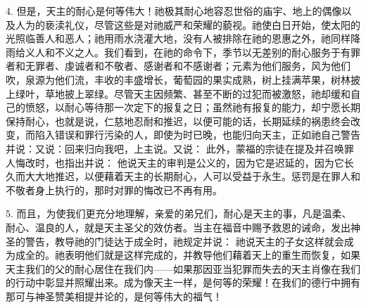 4. 但是，天主的耐心是何等伟大！祂极其耐心地容忍世俗的庙宇、地上的偶像以及人为的亵渎礼仪，尽管这些是对祂威严和荣耀的藐视。祂使白日开始，使太阳的光照临善人和恶人；祂用雨水浇灌大地，没有人被排除在祂的恩惠之外，祂同样降雨给义人和不义之人。我们看到，在祂的命令下，季节以无差别的耐心服务于有罪者和无罪者、虔诚者和不敬者、感谢者和不感谢者；元素为他们服务，风为他们吹，泉源为他们流，丰收的丰盛增长，葡萄园的果实成熟，树上挂满苹果，树林披上绿叶，草地披上翠绿。尽管天主因频繁、甚至不断的过犯而被激怒，祂却缓和自己的愤怒，以耐心等待那一次定下的报复之日；虽然祂有报复的能力，却宁愿长期保持耐心，也就是说，仁慈地忍耐和推迟，以便可能的话，长期延续的祸患终会改变，而陷入错误和罪行污染的人，即使为时已晚，也能归向天主，正如祂自己警告并说：又说：回来归向我吧，上主说。又说： 此外，蒙福的宗徒在提及并召唤罪人悔改时，也指出并说： 他说天主的审判是公义的，因为它是迟延的，因为它长久而大大地推迟，以便藉着天主的长期耐心，人可以受益于永生。惩罚是在罪人和不敬者身上执行的，那时对罪的悔改已不再有用。\par

5. 而且，为使我们更充分地理解，亲爱的弟兄们，耐心是天主的事，凡是温柔、耐心、温良的人，就是天主圣父的效仿者。当主在福音中赐予救恩的诫命，发出神圣的警告，教导祂的门徒达于成全时，祂规定并说： 祂说天主的子女这样就会成为成全的。祂表明他们就是这样完成的，并教导他们藉着天上的重生而恢复，如果天主我们的父的耐心居住在我们内——如果那因亚当犯罪而失去的天主肖像在我们的行动中彰显并照耀出来。成为像天主一样，是何等的荣耀！在我们的德行中拥有那可与神圣赞美相提并论的，是何等伟大的福气！\par

